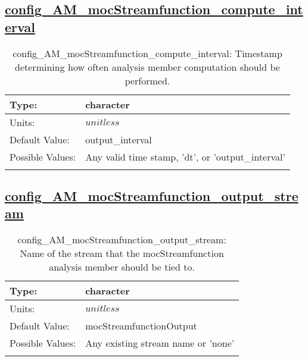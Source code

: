 \subsection[config\_AM\_mocStreamfunction\_compute\_interval]{\hyperref[sec:nm_tab_AM_mocStreamfunction]{config\_AM\_mocStreamfunction\_compute\_interval}}
\label{subsec:nm_sec_config_AM_mocStreamfunction_compute_interval}
\begin{center}
\begin{longtable}{| p{2.0in} || p{4.0in} |}
    \hline
    Type: & character \\
    \hline
    Units: & $unitless$ \\
    \hline
    Default Value: & output\_interval \\
    \hline
    Possible Values: & Any valid time stamp, 'dt', or 'output\_interval' \\
    \hline
    \caption{config\_AM\_mocStreamfunction\_compute\_interval: Timestamp determining how often analysis member computation should be performed.}
\end{longtable}
\end{center}
\subsection[config\_AM\_mocStreamfunction\_output\_stream]{\hyperref[sec:nm_tab_AM_mocStreamfunction]{config\_AM\_mocStreamfunction\_output\_stream}}
\label{subsec:nm_sec_config_AM_mocStreamfunction_output_stream}
\begin{center}
\begin{longtable}{| p{2.0in} || p{4.0in} |}
    \hline
    Type: & character \\
    \hline
    Units: & $unitless$ \\
    \hline
    Default Value: & mocStreamfunctionOutput \\
    \hline
    Possible Values: & Any existing stream name or 'none' \\
    \hline
    \caption{config\_AM\_mocStreamfunction\_output\_stream: Name of the stream that the mocStreamfunction analysis member should be tied to.}
\end{longtable}
\end{center}
